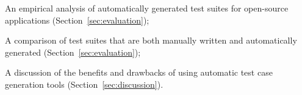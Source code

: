 \item An empirical analysis of automatically generated test suites for open-source applications (Section~\ref{sec:evaluation});

\item A comparison of test suites that are both manually written and automatically generated (Section~\ref{sec:evaluation});

\item A discussion of the benefits and drawbacks of using automatic test case generation tools (Section~\ref{sec:discussion}).

\squishend 

